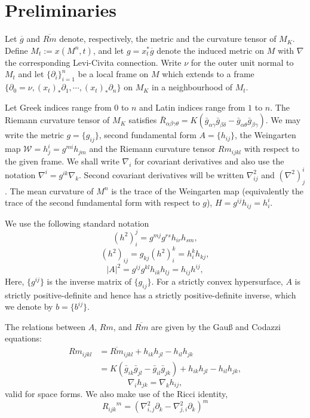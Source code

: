 \documentclass{amsart}
\begin{document}
\section{Preliminaries}

Let $\overline{g}$ and $\overline{Rm}$ denote, respectively, the metric and the curvature tensor of $M_K$. Define \(M_t := x(M^n,t)\), and let \(g = x_t^{\ast} \overline{g}\) denote the induced metric on \(M\) with $\nabla$ the corresponding Levi-Civita connection. Write $\nu$ for the outer unit normal to $M_t$ and let \(\{\partial_i\}_{i=1}^n\) be a local frame on \(M\) which extends to a frame \(\{\partial_0 = \nu, (x_t)_{\ast} \partial_1, \cdots, (x_t)_{\ast} \partial_n\}\) on \(M_K\) in a neighbourhood of \(M_t\). 

Let Greek indices range from \(0\) to \(n\) and Latin indices range from \(1\) to \(n\). The Riemann curvature tensor of \(M_K\) satisfies \(\bar{R}_{\alpha\beta\gamma\theta} = K(\bar{g}_{\alpha\gamma}\bar{g}_{\beta\delta} - \bar{g}_{\alpha\theta}\bar{g}_{\beta\gamma})\). We may write the metric $g = \{g_{ij}\}$, second fundamental form $A = \{h_{ij}\}$, the Weingarten map $\mathcal{W} = h^i_j = g^{mi} h_{jm}$ and the Riemann curvature tensor $Rm_{ijkl}$ with respect to the given frame. We shall write \(\nabla_i\) for covariant derivatives and also use the notation \(\nabla^i = g^{ik} \nabla_k\). Second covariant derivatives will be written \(\nabla^2_{ij}\) and \((\nabla^2)^i_j\). The mean curvature of $M^n$ is the trace of the Weingarten map (equivalently the trace of the second fundamental form with respect to $g$), $H = g^{ij}h_{ij} = h^i_i$.

We use the following standard notation
\[
(h^2)_i^j = g^{mj}g^{rs}h_{ir}h_{sm},
\]
\[
(h^2)_{ij} = g_{kj} (h^2)_i^k = h^k_i h_{kj},
\]
\[
|A|^2 = g^{ij}g^{kl}h_{ik}h_{lj} = h_{ij}h^{ij},
\]
Here, $\{g^{ij}\}$ is the inverse matrix of $\{g_{ij}\}.$ For a strictly convex hypersurface, \(A\) is strictly positive-definite and hence has a strictly positive-definite inverse, which we denote by \(b = \{b^{ij}\}\).

The relations between $A$, $Rm$, and $\overline{Rm}$ are given by the Gau{\ss} and Codazzi equations:
\[
\begin{split}
Rm_{ijkl} &= \overline{Rm}_{ijkl} + h_{ik}h_{jl} - h_{il}h_{jk} \\
&= K(\bar{g}_{ik}\bar{g}_{jl} - \bar{g}_{il}\bar{g}_{jk}) + h_{ik}h_{jl} - h_{il}h_{jk},
\end{split}
\]
\[
\nabla_i h_{jk} = \nabla_k h_{ij},
\]
valid for space forms. We also make use of the Ricci identity,
\[
{R_{ijk}}^m  = \left(\nabla^2_{i, j} \partial_k - \nabla^2_{j,i} \partial_k\right)^m
\]
\end{document}
